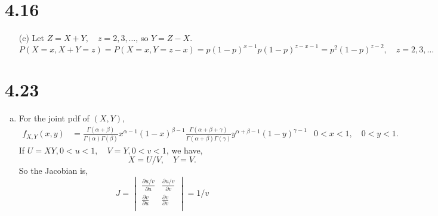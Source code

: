 \documentclass[letterpaper]{article}
\begin{document}
    \section*{4.16}
    \begin{enumerate}
    \item[(c)]
    Let $Z=X+Y, \quad z = 2, 3, \dots$, so $Y=Z-X$.
    \[
    P(X=x, X+Y=z) = P(X=x, Y=z-x) = p(1-p)^{x-1} p(1-p)^{z-x-1} = p^2(1-p)^{z-2}, \quad z = 2, 3, \dots
    \]
    \end{enumerate}
    \section*{4.23}
    \begin{enumerate}[(a)]
    \item
    For the joint pdf of $(X, Y)$,
    \begin{align*}
    f_{X,Y}(x,y) & = \frac{\Gamma(\alpha+\beta)}{\Gamma(\alpha)\Gamma(\beta)} x^{\alpha-1} (1-x)^{\beta-1} \frac{\Gamma(\alpha+\beta+\gamma)}{\Gamma(\alpha+\beta)\Gamma(\gamma)} y^{\alpha+\beta-1} (1-y)^{\gamma-1}
    & 0 < x < 1, \quad 0 < y < 1.
    \end{align*}
    If $U=XY, 0 < u < 1, \quad V=Y, 0 < v < 1$, we have, 
    \[
    X=U/V, \quad Y=V.
    \]
    So the Jacobian is,
    \[
    J = \begin{vmatrix}
    \frac{\partial u/v}{\partial u} & \frac{\partial u/v}{\partial v} \\
    \frac{\partial v}{\partial u} & \frac{\partial v}{\partial v} \\
    \end{vmatrix} = 1/v
    \]


\end{enumerate}
\end{document}
